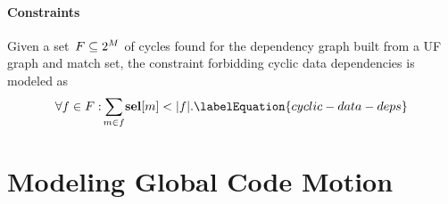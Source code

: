 \paragraph{Constraints}

Given a set~\mbox{$\mForbiddenCombSet \subseteq \mPowerset{\mMatchSet}$} of
\glspl{cycle} found for the \gls{dependency graph} built from a \gls{UF graph}
and \gls{match set}, the \gls{constraint} forbidding cyclic data dependencies is
modeled as
%
\begin{equation}
  \forall f \in \mForbiddenCombSet :
  \sum_{\mathclap{m \in f}} \mVar{sel}[m] < \mCard{f}.
  \labelEquation{cyclic-data-deps}
\end{equation}


\section{Modeling Global Code Motion}

